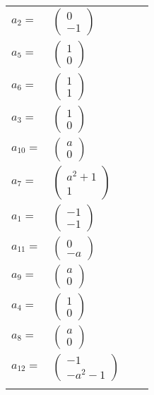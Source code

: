 \documentclass[1p]{elsarticle_modified}
\theoremstyle{definition}
\begin{document}
\begin{tabular}{m{7pt} m{180pt} m{7pt} m{180pt} }
\flushright $a_{2}=$&$\begin{pmatrix}0\\-1\end{pmatrix}$ \\
\flushright $a_{5}=$&$\begin{pmatrix}1\\0\end{pmatrix}$ \\
\flushright $a_{6}=$&$\begin{pmatrix}1\\1\end{pmatrix}$ \\
\flushright $a_{3}=$&$\begin{pmatrix}1\\0\end{pmatrix}$ \\
\flushright $a_{10}=$&$\begin{pmatrix}a\\0\end{pmatrix}$ \\
\flushright $a_{7}=$&$\begin{pmatrix}a^2+1\\1\end{pmatrix}$ \\
\flushright $a_{1}=$&$\begin{pmatrix}-1\\-1\end{pmatrix}$ \\
\flushright $a_{11}=$&$\begin{pmatrix}0\\- a\end{pmatrix}$ \\
\flushright $a_{9}=$&$\begin{pmatrix}a\\0\end{pmatrix}$ \\
\flushright $a_{4}=$&$\begin{pmatrix}1\\0\end{pmatrix}$ \\
\flushright $a_{8}=$&$\begin{pmatrix}a\\0\end{pmatrix}$ \\
\flushright $a_{12}=$&$\begin{pmatrix}-1\\- a^2-1\end{pmatrix}$\\&\end{tabular}
\end{document}

